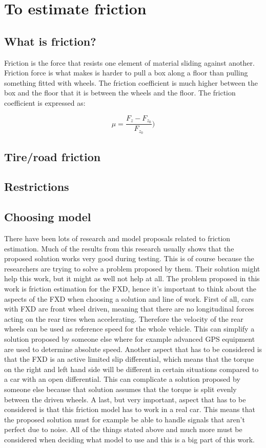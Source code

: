 \chapter{To estimate friction}

\section{What is friction?}
Friction is the force that resists one element of material sliding against another. Friction force is what makes is harder to pull a box along a floor than pulling something fitted with wheels. The friction coefficient is much higher between the box and the floor that it is between the wheels and the floor. The friction coefficient is expressed as:

\begin{equation}
\mu=\frac{F_{z} - F_{z_{0}}}{F_{z_{0}}})
\end{equation}




\section{Tire/road friction}

\section{Restrictions}

\section{Choosing model}
There have been lots of research and model proposals related to friction estimation. Much of the results from this research usually shows that the proposed solution works very good during testing. This is of course because the researchers are trying to solve a problem proposed by them. Their solution might help this work, but it might as well not help at all. The problem proposed in this work is friction estimation for the FXD, hence it's important to think about the aspects of the FXD when choosing a solution and line of work. First of all, cars with FXD are front wheel driven, meaning that there are no longitudinal forces acting on the rear tires when accelerating. Therefore the velocity of the rear wheels can be used as reference speed for the whole vehicle. This can simplify a solution proposed by someone else where for example advanced GPS equipment are used to determine absolute speed. Another aspect that has to be considered is that the FXD is an active limited slip differential, which means that the torque on the right and left hand side will be different in certain situations compared to a car with an open differential. This can complicate a solution proposed by someone else because that solution assumes that the torque is split evenly between the driven wheels. A last, but very important, aspect that has to be considered is that this friction model has to work in a real car. This means that the proposed solution must for example be able to handle signals that aren't perfect due to noise. All of the things stated above and much more must be considered when deciding what model to use and this is a big part of this work.

